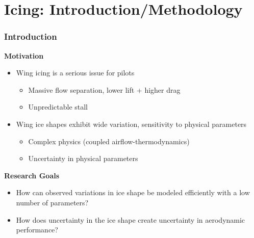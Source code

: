 \documentclass[9pt]{beamer}
\begin{document}
\section{Icing: Introduction/Methodology}
\label{sec-1}
\begin{frame}
\frametitle{Introduction}
\label{sec-1-1}

\textbf{Motivation}
\begin{itemize}
\item Wing icing is a serious issue for pilots
\begin{itemize}
\item Massive flow separation, lower lift + higher drag
\item Unpredictable stall
\end{itemize}
\item Wing ice shapes exhibit wide variation, sensitivity to physical
  parameters
\begin{itemize}
\item Complex physics (coupled airflow-thermodynamics)
\item Uncertainty in physical parameters
\end{itemize}
\end{itemize}
\textbf{Research Goals}
\begin{itemize}
\item How can observed variations in ice shape be modeled
  efficiently with a low number of parameters?
\item How does uncertainty in the ice shape create uncertainty in
  aerodynamic performance?
\end{itemize}
\end{frame}
\end{document}
